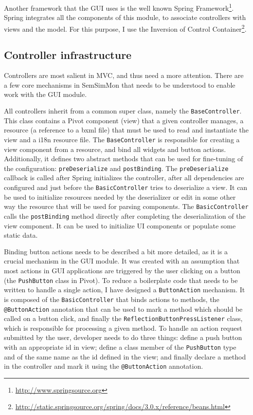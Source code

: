 Another framework that the GUI uses is the well known Spring Framework\footnote{\url{http://www.springsource.org}}. Spring integrates all the components of this module, to associate controllers with views and the model. For this purpose, I use the Inversion of Control Container\footnote{\url{http://static.springsource.org/spring/docs/3.0.x/reference/beans.html}}. 

\subsection{Controller infrastructure}

Controllers are most salient in MVC, and thus need a more attention. There are a few core mechanisms in SemSimMon that needs to be understood to enable work with the GUI module.

All controllers inherit from a common super class, namely the \texttt{BaseController}. This class contains a Pivot component (view) that a given controller manages, a resource (a reference to a bxml file) that must be used to read and instantiate the view and a i18n resource file. The \texttt{BaseController} is responsible for creating a view component from a resource, and bind all widgets and button actions. Additionally, it defines two abstract methods that can be used for fine-tuning of the configuration: \texttt{preDeserialize} and \texttt{postBinding}. The \texttt{preDeserialize} callback is called after Spring initializes the controller, after all dependencies are configured and just before the \texttt{BasicController} tries to deserialize a view. It can be used to initialize resources needed by the deserializer or edit in some other way the resource that will be used for parsing components. The \texttt{BasicController} calls the \texttt{postBinding} method directly after completing the deserialization of the view component. It can be used to initialize UI components or populate some static data.

Binding button actions needs to be described a bit more detailed, as it is a crucial mechanism in the GUI module. It was created with an assumption that most actions in GUI applications are triggered by the user clicking on a button (the \texttt{PushButton} class in Pivot). To reduce a boilerplate code that needs to be written to handle a single action, I have designed a \texttt{ButtonAction} mechanism. It is composed of the \texttt{BasicController} that binds actions to methods, the \texttt{@ButtonAction} annotation that can be used to mark a method which should be called on a button click, and finally the \texttt{ReflectionButtonPressListener} class, which is responsible for processing a given method. To handle an action request submitted by the user, developer needs to do three things: define a push button with an appropriate id in view; define a class member of the \texttt{PushButton} type and of the same name as the id defined in the view; and finally declare a method in the controller and mark it using the \texttt{@ButtonAction} annotation.

